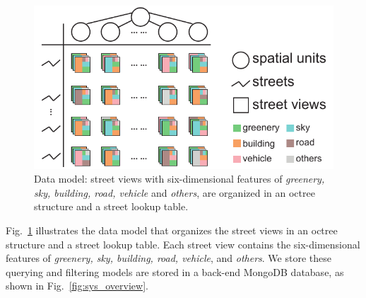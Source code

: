 \begin{figure}[t]
	\centering
	\includegraphics[width=0.8\columnwidth]{figure/streetvizor/fig4_data_model/data_model}
	\vspace{-3mm}
	\caption{Data model: street views with six-dimensional features of \textit{greenery, sky, building, road, vehicle} and \textit{others}, are organized in an octree structure and a street lookup table.}
	\vspace{-5mm}
	\label{fig:data_model}
\end{figure}

\vspace*{-2mm}
Fig.~\ref{fig:data_model} illustrates the data model that organizes the street views in an octree structure and a street lookup table.
Each street view contains the six-dimensional features of \textit{greenery, sky, building, road, vehicle}, and \textit{others}.
We store these querying and filtering models are stored in a back-end MongoDB database, as shown in Fig.~\ref{fig:sys_overview}.
